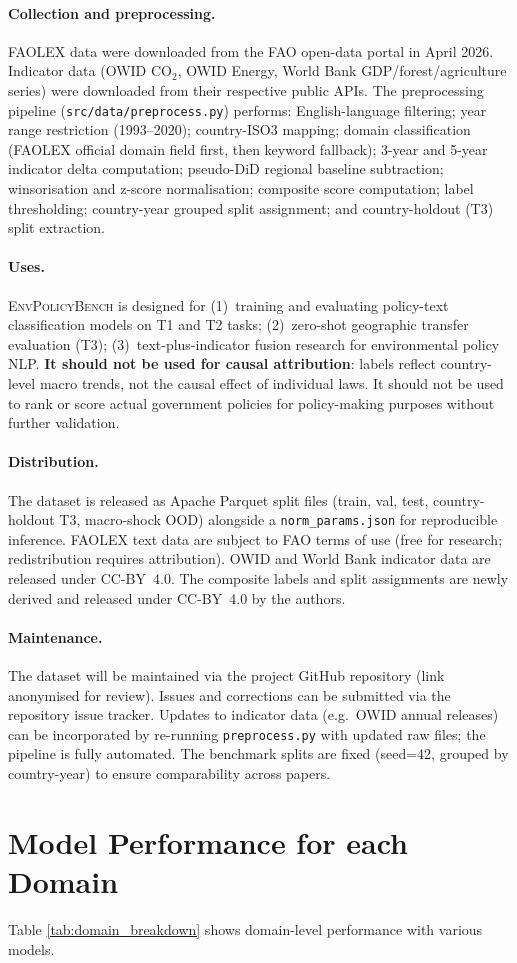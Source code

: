\documentclass[11pt]{article}
\newcommand{\bench}{\textsc{EnvPolicyBench}}
\begin{document}
\paragraph{Collection and preprocessing.}
FAOLEX data were downloaded from the FAO open-data portal in April 2026.
Indicator data (OWID CO$_2$, OWID Energy, World Bank GDP/forest/agriculture
series) were downloaded from their respective public APIs.
The preprocessing pipeline (\texttt{src/data/preprocess.py}) performs:
English-language filtering; year range restriction (1993--2020); country-ISO3
mapping; domain classification (FAOLEX official domain field first, then keyword
fallback); 3-year and 5-year indicator delta computation; pseudo-DiD regional
baseline subtraction; winsorisation and z-score normalisation; composite score
computation; label thresholding; country-year grouped split assignment; and
country-holdout (T3) split extraction.

\paragraph{Uses.}
\bench{} is designed for (1)~training and evaluating policy-text classification
models on T1 and T2 tasks; (2)~zero-shot geographic transfer evaluation (T3);
(3)~text-plus-indicator fusion research for environmental policy NLP.
\textbf{It should not be used for causal attribution}: labels reflect
country-level macro trends, not the causal effect of individual laws.
It should not be used to rank or score actual government policies for
policy-making purposes without further validation.

\paragraph{Distribution.}
The dataset is released as Apache Parquet split files (train, val, test,
country-holdout T3, macro-shock OOD) alongside a \texttt{norm\_params.json}
for reproducible inference. FAOLEX text data are subject to FAO terms of use
(free for research; redistribution requires attribution).
OWID and World Bank indicator data are released under CC-BY~4.0.
The composite labels and split assignments are newly derived and released
under CC-BY~4.0 by the authors.

\paragraph{Maintenance.}
The dataset will be maintained via the project GitHub repository (link
anonymised for review). Issues and corrections can be submitted via the
repository issue tracker. Updates to indicator data (e.g.\ OWID annual
releases) can be incorporated by re-running \texttt{preprocess.py} with
updated raw files; the pipeline is fully automated. The benchmark splits
are fixed (seed=42, grouped by country-year) to ensure comparability
across papers.

\section{Model Performance for each Domain }
\label{app:domain_breakdown}
Table \ref{tab:domain_breakdown} shows domain-level performance with various models.



 
\end{document}
